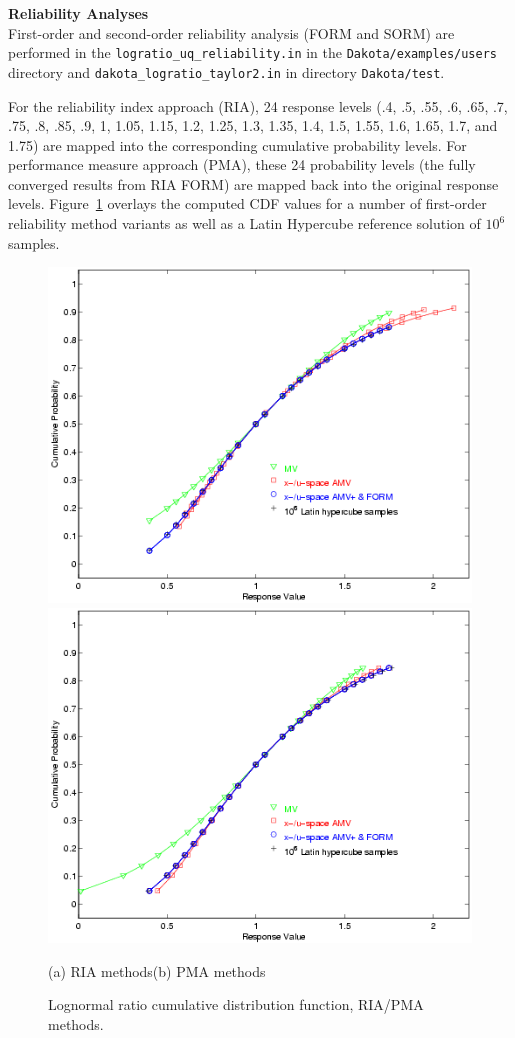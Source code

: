 {\bf Reliability Analyses} \\

First-order and second-order reliability analysis (FORM and SORM) are performed in the
\texttt{logratio\_uq\_reliability.in} in the {\tt Dakota/examples/users}
 directory and \texttt{dakota\_logratio\_taylor2.in} in directory
{\tt Dakota/test}.

For the reliability index approach (RIA),
24 response levels (.4, .5, .55,
.6, .65, .7, .75, .8, .85, .9, 1, 1.05, 1.15, 1.2, 1.25, 1.3, 1.35,
1.4, 1.5, 1.55, 1.6, 1.65, 1.7, and 1.75) are mapped into the
corresponding cumulative probability levels. For performance measure approach (PMA), these 24
probability levels (the fully converged results from RIA FORM) are
mapped back into the original response levels.
Figure~\ref{fig:log_ratio_cdf} overlays the computed CDF values for a
number of first-order reliability method variants as well as a Latin
Hypercube reference solution of $10^6$ samples.
\begin{figure}[hbp]
\centering
\centerline{\includegraphics[scale=0.5]{images/log_ratio_cdf_ria}
            \includegraphics[scale=0.5]{images/log_ratio_cdf_pma}}
(a) RIA methods\hspace{2.5in}(b) PMA methods
\caption{Lognormal ratio cumulative distribution function, RIA/PMA methods.}
\label{fig:log_ratio_cdf}
\end{figure}

